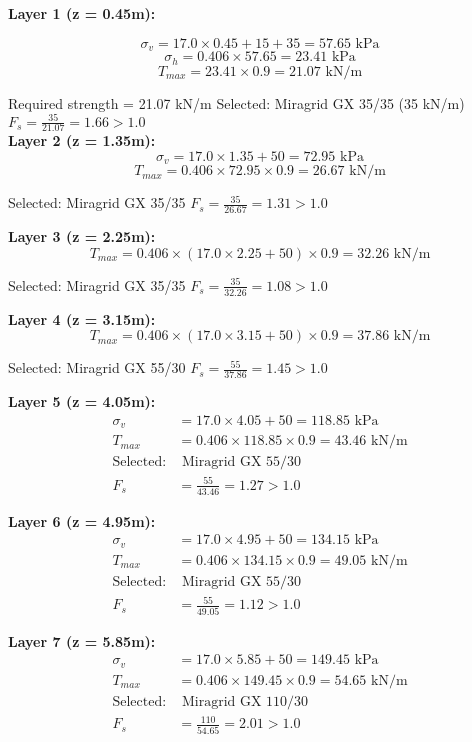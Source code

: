 \documentclass[10pt,a4paper,twocolumn]{article}
\begin{document}
 \textbf{Layer 1 (z = 0.45m):}

$$\sigma_v = 17.0 \times 0.45 + 15 + 35 = 57.65 \text{ kPa}$$
$$\sigma_h = 0.406 \times 57.65 = 23.41 \text{ kPa}$$
$$T_{max} = 23.41 \times 0.9 = 21.07 \text{ kN/m}$$

Required strength = 21.07 kN/m
Selected: Miragrid GX 35/35 (35 kN/m)
$F_s = \frac{35}{21.07} = 1.66 > 1.0$ \\

\textbf{Layer 2 (z = 1.35m):}
$$\sigma_v = 17.0 \times 1.35 + 50 = 72.95 \text{ kPa}$$
$$T_{max} = 0.406 \times 72.95 \times 0.9 = 26.67 \text{ kN/m}$$

Selected: Miragrid GX 35/35
$F_s = \frac{35}{26.67} = 1.31 > 1.0$ 

\textbf{Layer 3 (z = 2.25m):}
$$T_{max} = 0.406 \times (17.0 \times 2.25 + 50) \times 0.9 = 32.26 \text{ kN/m}$$

Selected: Miragrid GX 35/35
$F_s = \frac{35}{32.26} = 1.08 > 1.0$ 

\textbf{Layer 4 (z = 3.15m):}
$$T_{max} = 0.406 \times (17.0 \times 3.15 + 50) \times 0.9 = 37.86 \text{ kN/m}$$

Selected: Miragrid GX 55/30
$F_s = \frac{55}{37.86} = 1.45 > 1.0$ 

\textbf{Layer 5 (z = 4.05m):}
\begin{align}
\sigma_v &= 17.0 \times 4.05 + 50 = 118.85 \text{ kPa} \\
T_{max} &= 0.406 \times 118.85 \times 0.9 = 43.46 \text{ kN/m} \\
\text{Selected:} &\text{ Miragrid GX 55/30} \\
F_s &= \frac{55}{43.46} = 1.27 > 1.0 
\end{align}

\textbf{Layer 6 (z = 4.95m):}
\begin{align}
\sigma_v &= 17.0 \times 4.95 + 50 = 134.15 \text{ kPa} \\
T_{max} &= 0.406 \times 134.15 \times 0.9 = 49.05 \text{ kN/m} \\
\text{Selected:} &\text{ Miragrid GX 55/30} \\
F_s &= \frac{55}{49.05} = 1.12 > 1.0 
\end{align}

\textbf{Layer 7 (z = 5.85m):}
\begin{align}
\sigma_v &= 17.0 \times 5.85 + 50 = 149.45 \text{ kPa} \\
T_{max} &= 0.406 \times 149.45 \times 0.9 = 54.65 \text{ kN/m} \\
\text{Selected:} &\text{ Miragrid GX 110/30} \\
F_s &= \frac{110}{54.65} = 2.01 > 1.0 
\end{align}
\end{document}
